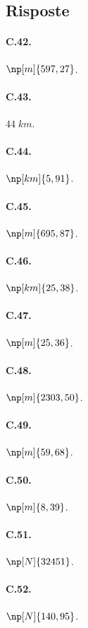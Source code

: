 \subsection{Risposte}
\begin{multicols}{3}
 \paragraph{C.42.}$\np[m]{597,27}$.

\paragraph{C.43.}$44\;\unit{km}$.

\paragraph{C.44.}$\np[km]{5,91}$.

\paragraph{C.45.}$\np[m]{695,87}$.

\paragraph{C.46.}$\np[km]{25,38}$.

\paragraph{C.47.}$\np[m]{25,36}$.

\paragraph{C.48.}$\np[m]{2303,50}$.

\paragraph{C.49.}$\np[m]{59,68}$.

\paragraph{C.50.}$\np[m]{8,39}$.

\paragraph{C.51.}$\np[N]{32451}$.

\paragraph{C.52.}$\np[N]{140,95}$.


\end{multicols}
